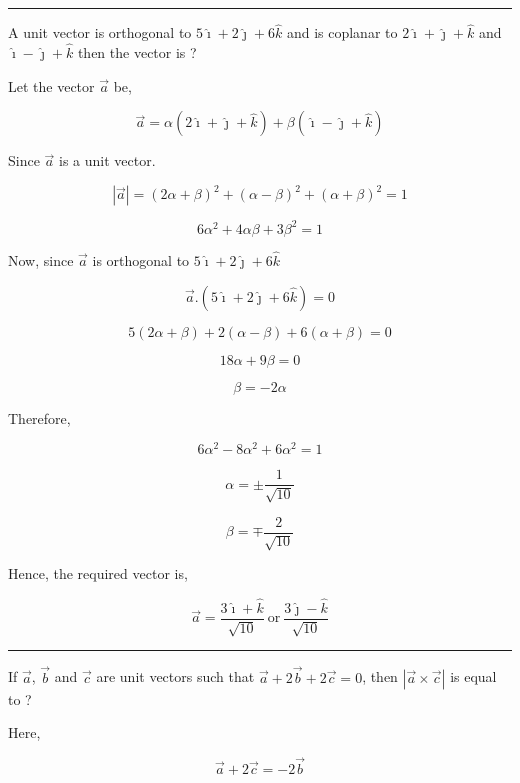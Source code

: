 \documentclass[twocolumn]{article}
\begin{document}
\begin{CJK*}{UTF8}{gbsn}
\hrule

\vspace*{0.1in}

\begin{question}
    A unit vector is orthogonal to \(5 \hat{\imath}  + 2 \hat{\jmath} + 6\hat{k} \)  and is coplanar to \(2 \hat{\imath}  + \hat{\jmath}  + \hat{k} \) and \(\hat{\imath} -\hat{\jmath} +\hat{k} \) then the vector is ?  
\end{question}

Let the vector \(\vec{a} \) be,

\[
    \vec{a}  = \alpha ( 2 \hat{\imath} + \hat{\jmath} + \hat{k}) + \beta (\hat{\imath}  - \hat{\jmath} + \hat{k} )
\]

Since \(\vec{a} \) is a unit vector.

\[
    |\vec{a} | = (2\alpha + \beta )^{2} + (\alpha -\beta)^{2} + (\alpha + \beta)^{2} = 1  
\]

\[
    6\alpha^2 + 4\alpha \beta + 3\beta^{2} = 1 \tag{1}
\]

Now, since \(\vec{a}\) is orthogonal to \(5 \hat{\imath} +2\hat{\jmath} + 6\hat{k} \)

\[
    \vec{a} . (5\hat{\imath}  + 2\hat{\jmath} + 6\hat{k} ) = 0
\]

\[
    5(2\alpha + \beta) + 2(\alpha -\beta ) + 6(\alpha + \beta ) = 0
\]

\[
    18\alpha + 9\beta = 0
\]

\[
    \beta = -2\alpha 
\]

Therefore, 

\[
    6\alpha ^2 - 8\alpha ^{2} + 6\alpha ^{2} = 1
\]

\[
    \alpha  = \pm \frac{1}{\sqrt{10} }
\]

\[
    \beta = \mp\frac{2}{\sqrt{10} }
\]

Hence, the required vector is,

\[\boxed{
    \vec{a} = \frac{3 \hat{\imath}  + \hat{k} }{\sqrt{10} }\ \text{or}\ \frac{3 \hat{\jmath}  - \hat{k} }{\sqrt{10} }}
\]

\hrule

\begin{question}
    If \(\vec{a}\), \(\vec{b} \) and \(\vec{c} \) are unit vectors such that \(\vec{a}  + 2 \vec{b} + 2\vec{c} = 0\), then \( |\vec{a} \times \vec{c}| \) is equal to ?  
\end{question}

Here, 

\[
    \vec{a} + 2\vec{c}  = -2\vec{b} 
\]


\end{CJK*}
\end{document}
